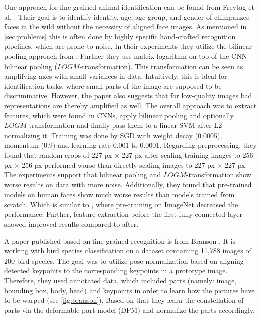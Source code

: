 \documentclass[electronic]{vgtc}             %
\begin{document}
	One approach for fine-grained animal identification can be found from Freytag et al. \cite{Freytag:2014}. 
	Their goal is to identify identity, age, age group, and gender of chimpanzee faces in the wild without the necessity of aligned face images. 
	As mentioned in \autoref{sec:problems} this is often done by highly specific hand-crafted recognition pipelines, which are prone to noise.
	In their experiments they utilize the bilinear pooling approach from \cite{Lin:2015}.
	Further they use matrix logarithm on top of the CNN bilinear pooling ($LOGM$-transformation).
	This transformation can be seen as amplifying axes with small variances in data.
	Intuitively, this is ideal for identification tasks, where small parts of the image are supposed to be discriminative. 
	However, the paper also suggests that for low-quality images bad representations are thereby amplified as well.
	The overall approach was to extract features, which were found in CNNs, apply bilinear pooling and optionally $LOGM$-transformation and finally pass them to a linear SVM after L2-normalizing it.
	Training was done by SGD with weight decay (0.0005), momentum (0.9) and learning rate 0.001 to 0.0001.
	Regarding preprocessing, they found that random crops of 227 px $\times$ 227 px
	after scaling training images to 256 px $\times$ 256 px performed worse than directly scaling images to 227 px $\times$ 227 px.
	The experiments support that bilinear pooling and $LOGM$-transformation show worse results on data with more noise.
	Additionally, they found that pre-trained models on human faces \cite{Parkhi:2015} show much worse results than models trained from scratch. 
	Which is similar to \cite{Norouzzadeh:2017, Norouzzadeh:2017:Count}, where pre-training on ImageNet decreased the performance. 
	Further, feature extraction before the first fully connected layer showed improved results compared to after.
	
	A paper published based on fine-grained recognition is from Branson \cite{Branson:2014}.
	It is working with bird species classification on a dataset containing 11,788 images of 200 bird species.
	The goal was to utilize pose normalization based on aligning detected keypoints to the corresponding keypoints in a prototype image.
	Therefore, they used annotated data, which included parts (namely: image, bounding box, body, head) and keypoints in order to learn how the pictures have to be warped (see \autoref{fig:branson}).
	Based on that they learn the constellation of parts via the deformable part model (DPM) and normalize the parts accordingly.
	
\end{document}

